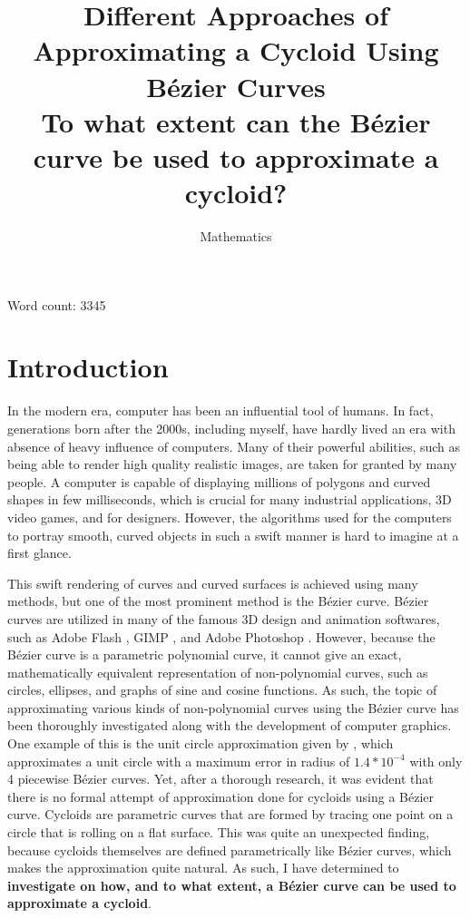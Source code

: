 \documentclass[12pt, oneside, appendixprefix=Appendix]{article}
\title{%
\large Different Approaches of Approximating a Cycloid Using B\'ezier Curves\\
\LARGE To what extent can the B\'ezier curve be used to approximate a cycloid?}
\author{Mathematics}
\date{}							%
\theoremstyle{definition}
\numberwithin{figure}{section}
\begin{document}
\begin{titlingpage}
\maketitle
Word count: 3345
\end{titlingpage}
\tableofcontents
\newpage

\section{Introduction}
In the modern era, computer has been an influential tool of humans. In fact, generations born after the 2000s, including myself, have hardly lived an era with absence of heavy influence of computers. Many of their powerful abilities, such as being able to render high quality realistic images, are taken for granted by many people. A computer is capable of displaying millions of polygons and curved shapes in few milliseconds, which is crucial for many industrial applications, 3D video games, and for designers. However, the algorithms used for the computers to portray smooth, curved objects in such a swift manner is hard to imagine at a first glance.

This swift rendering of curves and curved surfaces is achieved using many methods, but one of the most prominent method is the B\'ezier curve. B\'ezier curves are utilized in many of the famous 3D design and animation softwares, such as Adobe Flash , GIMP , and Adobe Photoshop . However, because the B\'ezier curve is a parametric polynomial curve, it cannot give an exact, mathematically equivalent representation of non-polynomial curves, such as circles, ellipses, and graphs of sine and cosine functions. As such, the topic of approximating various kinds of non-polynomial curves using the B\'ezier curve has been thoroughly investigated along with the development of computer graphics. One example of this is the unit circle approximation given by , which approximates a unit circle with a maximum error in radius of $1.4*10^{-4}$ with only 4 piecewise B\'ezier curves. Yet, after a thorough research, it was evident that there is no formal attempt of approximation done for cycloids using a B\'ezier curve. Cycloids are parametric curves that are formed by tracing one point on a circle that is rolling on a flat surface. This was quite an unexpected finding, because cycloids themselves are defined parametrically like B\'ezier curves, which makes the approximation quite natural. As such, I have determined to \textbf{investigate on how, and to what extent, a B\'ezier curve can be used to approximate a cycloid}.
\end{document}
